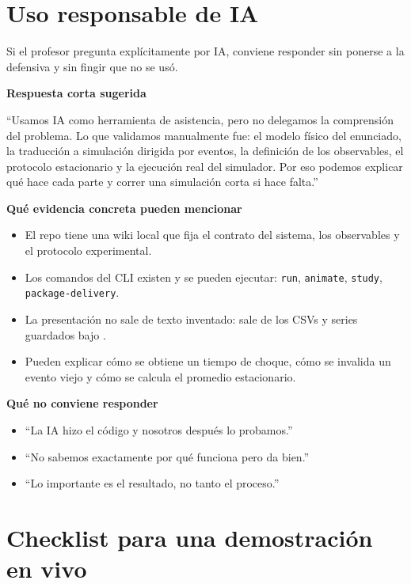 \documentclass[11pt]{article}
\newcommand{\sectionbox}[1]{
  \vspace{0.4em}
  {\colorbox{tplight}{\parbox{\dimexpr\linewidth-2\fboxsep\relax}{\textbf{\color{tpblue}#1}}}}
  \vspace{0.35em}
}
\begin{document}
\section{Uso responsable de IA}
\label{sec:ia}

Si el profesor pregunta expl\'icitamente por IA, conviene responder sin ponerse a la defensiva y sin fingir que no se us\'o.

\sectionbox{Respuesta corta sugerida}

``Usamos IA como herramienta de asistencia, pero no delegamos la comprensi\'on del problema. Lo que validamos manualmente fue: el modelo f\'isico del enunciado, la traducci\'on a simulaci\'on dirigida por eventos, la definici\'on de los observables, el protocolo estacionario y la ejecuci\'on real del simulador. Por eso podemos explicar qu\'e hace cada parte y correr una simulaci\'on corta si hace falta.'' 

\sectionbox{Qu\'e evidencia concreta pueden mencionar}

\begin{itemize}
  \item El repo tiene una wiki local que fija el contrato del sistema, los observables y el protocolo experimental.
  \item Los comandos del CLI existen y se pueden ejecutar: \texttt{run}, \texttt{animate}, \texttt{study}, \texttt{package-delivery}.
  \item La presentaci\'on no sale de texto inventado: sale de los CSVs y series guardados bajo .
  \item Pueden explicar c\'omo se obtiene un tiempo de choque, c\'omo se invalida un evento viejo y c\'omo se calcula el promedio estacionario.
\end{itemize}

\sectionbox{Qu\'e no conviene responder}

\begin{itemize}
  \item ``La IA hizo el c\'odigo y nosotros despu\'es lo probamos.''
  \item ``No sabemos exactamente por qu\'e funciona pero da bien.''
  \item ``Lo importante es el resultado, no tanto el proceso.''
\end{itemize}

\section{Checklist para una demostraci\'on en vivo}
\label{sec:vivo}
\end{document}
